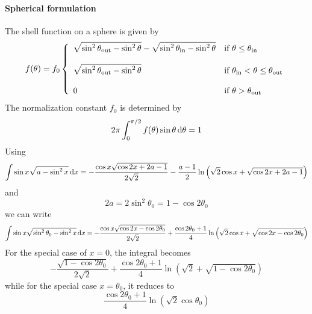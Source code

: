 \documentclass{article}[12pt,a4]
\begin{document}
\paragraph{Spherical formulation}
 
The shell function on a sphere is given by
\begin{equation}
f(\theta) = f_0 \left \{
   \begin{array}{l l}
      \displaystyle
      \sqrt{ \sin^2 \theta_{\rm out} - \sin^2 \theta } - \sqrt{ \sin^2 \theta_{\rm in} - \sin^2 \theta }
      & \mbox{if $\theta \le \theta_{\rm in}$} \\
      \\
     \displaystyle
      \sqrt{ \sin^2 \theta_{\rm out} - \sin^2 \theta }
      & \mbox{if $\theta_{\rm in} < \theta \le \theta_{\rm out}$} \\
      \\
     \displaystyle
     0 & \mbox{if $\theta > \theta_{\rm out}$}
   \end{array}
   \right .
\end{equation}
The normalization constant $f_0$ is determined by
\begin{equation}
2 \pi \int_0^{\pi/2} f(\theta) \sin \theta \, {\rm d}\theta = 1
\end{equation}
Using
\begin{equation}
\int \sin x \sqrt {a - \sin^2 x} \, {\rm d}x = 
-\frac{\cos x \sqrt{\cos 2x + 2a-1}}{2 \sqrt{2}}
-\frac{a-1}{2} \ln \left( \sqrt{2} \cos x + \sqrt{\cos 2x + 2a-1} \right)
\end{equation}
and
\begin{equation}
2 a = 2\sin^2 \theta_0 = 1-\cos 2 \theta_0
\end{equation}
we can write
\begin{equation}
\int \sin x \sqrt {\sin^2 \theta_0 - \sin^2 x} \, {\rm d}x =
-\frac{\cos x \sqrt{\cos 2x - \cos 2\theta_0}}{2 \sqrt{2}}
+\frac{\cos 2\theta_0+1}{4} \ln \left( \sqrt{2} \cos x + \sqrt{\cos 2x - \cos 2\theta_0} \right)
\end{equation}
For the special case of $x=0$, the integral becomes
\begin{equation}
-\frac{\sqrt{1 - \cos 2\theta_0}}{2 \sqrt{2}}
+\frac{\cos 2\theta_0+1}{4} \ln \left( \sqrt{2} + \sqrt{1 - \cos 2\theta_0} \right)
\end{equation}
while for the special case $x=\theta_0$, it reduces to
\begin{equation}
\frac{\cos 2\theta_0+1}{4} \ln \left( \sqrt{2} \cos \theta_0 \right)
\end{equation}
\end{document}
